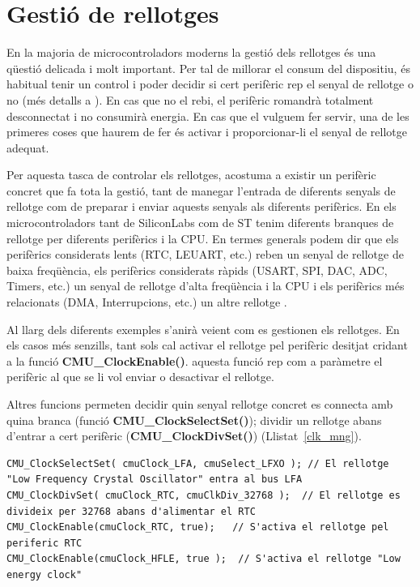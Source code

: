\chapter{Gestió de rellotges}
\label{sec:clocks}
En la majoria de microcontroladors moderns la gestió dels rellotges és una qüestió delicada i molt important. Per tal de millorar el consum del dispositiu, és habitual tenir un control i poder decidir si cert perifèric rep el senyal de rellotge o no (més detalls a ). En cas que no el rebi, el perifèric romandrà totalment desconnectat i no consumirà energia. En cas que el vulguem fer servir, una de les primeres coses que haurem de fer és activar i proporcionar-li el senyal de rellotge adequat.

Per aquesta tasca de controlar els rellotges, acostuma a existir un perifèric concret que fa tota la gestió, tant de manegar l'entrada de diferents senyals de rellotge com de preparar i enviar aquests senyals als diferents perifèrics. En els microcontroladors tant de SiliconLabs com de ST tenim diferents branques de rellotge per diferents perifèrics i la CPU. En termes generals podem dir que els perifèrics considerats lents (RTC, LEUART, etc.) reben un senyal de rellotge de baixa freqüència, els perifèrics considerats ràpids (USART, SPI, DAC, ADC, Timers, etc.) un senyal de rellotge d'alta freqüència i la CPU i els perifèrics més relacionats (DMA, Interrupcions, etc.) un altre rellotge \cite[94]{EFM32GRM}\cite[152]{STM32F4RM}.

Al llarg dels diferents exemples s'anirà veient com es gestionen els rellotges. En els casos més senzills, tant sols cal activar el rellotge pel perifèric desitjat cridant a la funció {\bf CMU\_ClockEnable()}. aquesta funció rep com a paràmetre el perifèric al que se li vol enviar o desactivar el rellotge.

Altres funcions permeten decidir quin senyal rellotge concret es connecta amb quina branca (funció {\bf CMU\_ClockSelectSet()}); dividir un rellotge abans d'entrar a cert perifèric ({\bf CMU\_ClockDivSet()}) (Llistat~\ref{clk_mng}).

\begin{lstlisting}[style=customc,caption={Exemple de configuració del rellotge pel RTC},label=clk_mng]
CMU_ClockSelectSet( cmuClock_LFA, cmuSelect_LFXO ); // El rellotge "Low Frequency Crystal Oscillator" entra al bus LFA
CMU_ClockDivSet( cmuClock_RTC, cmuClkDiv_32768 );  // El rellotge es divideix per 32768 abans d'alimentar el RTC
CMU_ClockEnable(cmuClock_RTC, true);   // S'activa el rellotge pel periferic RTC
CMU_ClockEnable(cmuClock_HFLE, true );  // S'activa el rellotge "Low energy clock"
\end{lstlisting}


